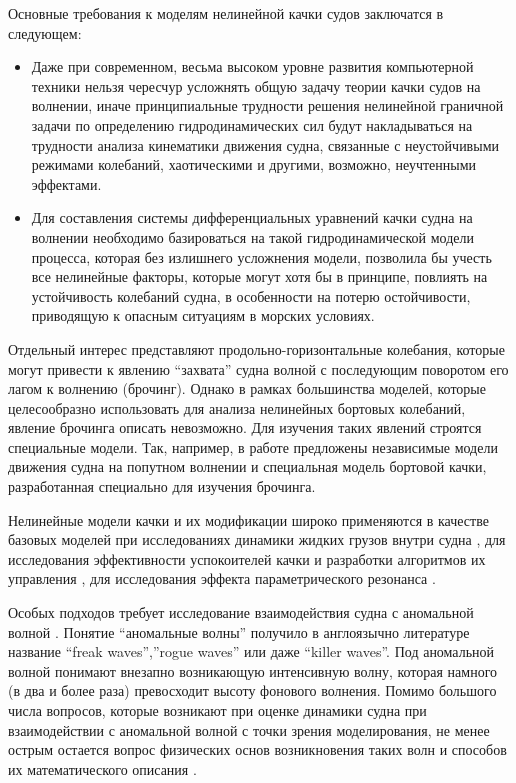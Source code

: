 Основные требования к моделям нелинейной качки судов заключатся в следующем: 
\begin{itemize}
	\item Даже при современном, весьма высоком уровне развития компьютерной техники нельзя чересчур усложнять общую задачу теории качки судов на волнении, иначе принципиальные трудности решения нелинейной граничной задачи по определению гидродинамических сил будут накладываться на трудности анализа кинематики движения судна, связанные с неустойчивыми режимами колебаний, хаотическими и другими, возможно, неучтенными эффектами.
	\item Для составления системы дифференциальных уравнений качки судна на волнении необходимо базироваться на такой гидродинамической модели процесса, которая без излишнего усложнения модели, позволила бы учесть все нелинейные факторы, которые могут хотя бы в принципе, повлиять на устойчивость колебаний судна, в особенности на потерю остойчивости, приводящую к опасным ситуациям в морских условиях.
\end{itemize}

Отдельный интерес представляют продольно-горизонтальные колебания, которые могут привести к явлению “захвата” судна волной с последующим поворотом его лагом к волнению (брочинг). Однако в рамках большинства моделей, которые целесообразно использовать для анализа нелинейных бортовых колебаний, явление брочинга описать невозможно. Для изучения таких явлений строятся специальные модели. Так, например, в работе \citep{dk23}\citep{dk24} предложены независимые модели движения судна на попутном волнении и специальная модель бортовой качки, разработанная специально для изучения брочинга. 

Нелинейные модели качки и их модификации широко применяются в качестве базовых моделей при исследованиях динамики жидких грузов внутри судна \citep{dk25}\citep{dk26}, для исследования эффективности успокоителей качки и разработки алгоритмов их управления \citep{dk27}\citep{dk28}\citep{dk29}, для исследования эффекта параметрического резонанса \citep{dk30}.

Особых подходов требует исследование взаимодействия судна с аномальной волной \citep{dk31}. Понятие “аномальные волны” получило в англоязычно литературе название “freak waves”,”rogue waves” или даже “killer waves”. Под аномальной волной понимают внезапно возникающую интенсивную волну, которая намного (в два и более раза) превосходит высоту фонового волнения. Помимо большого числа вопросов, которые возникают при оценке динамики судна при взаимодействии с аномальной волной с точки зрения моделирования, не менее острым остается вопрос физических основ возникновения таких волн и способов их математического описания \citep{dk32}.

